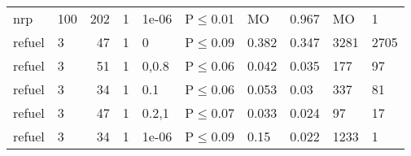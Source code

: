 \begin{longtable}{llrrllllll}
 nrp           & 100      &    	202 & 1 & 1e-06 & P$\leq$0.01  & MO      & 0.967    & MO     & 1      \\
 refuel        & 3        &     	47 & 1 & 0     & P$\leq$0.09  & 0.382   & 0.347    & 3281   & 2705   \\
 refuel        & 3        &     	51 & 1 & 0,0.8 & P$\leq$0.06  & 0.042   & 0.035    & 177    & 97     \\
 refuel        & 3        &     	34 & 1 & 0.1   & P$\leq$0.06  & 0.053   & 0.03     & 337    & 81     \\
 refuel        & 3        &     	47 & 1 & 0.2,1 & P$\leq$0.07  & 0.033   & 0.024    & 97     & 17     \\
 refuel        & 3        &     	34 & 1 & 1e-06 & P$\leq$0.09  & 0.15    & 0.022    & 1233   & 1      \\
\bottomrule
\end{longtable}
